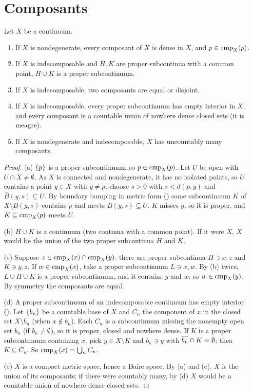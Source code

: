 \section{Composants}

\begin{theorem}\label{thm:composants}
Let $X$ be a continuum.
\begin{enumerate}[label=(\alph*)]
\item If $X$ is nondegenerate, every composant of $X$ is dense in $X$, and $p\in\operatorname{cmp}_{X}(p)$.
\item If $X$ is indecomposable and $H,K$ are proper subcontinua with a common point, $H\cup K$ is a
proper subcontinuum.
\item If $X$ is indecomposable, two composants are equal or disjoint.
\item If $X$ is indecomposable, every proper subcontinuum has empty interior in $X$, and every
composant is a countable union of nowhere dense closed sets (it is meagre).
\item If $X$ is nondegenerate and indecomposable, $X$ has uncountably many composants.
\end{enumerate}
\end{theorem}

\begin{proof}
(a) $\left\{ p \right\}$ is a proper subcontinuum, so $p\in\operatorname{cmp}_{X}(p)$. Let $U$ be open with $U\cap X\neq\emptyset$. As $X$
is connected and nondegenerate, it has no isolated points, so $U$ contains a point $y\in X$ with $y\ne
p$; choose $s>0$ with $s<d(p,y)$ and $\bar B(y,s)\subseteq U$. By boundary bumping in metric form
() some subcontinuum $K$ of $X\setminus B(y,s)$ contains $p$ and meets $\bar
B(y,s)\subseteq U$. $K$ misses $y$, so it is proper, and $K\subseteq\operatorname{cmp}_{X}(p)$ meets $U$.

(b) $H\cup K$ is a continuum (two continua with a common point). If it were $X$, $X$ would be the union of
the two proper subcontinua $H$ and $K$.

(c) Suppose $z\in\operatorname{cmp}_{X}(x)\cap\operatorname{cmp}_{X}(y)$: there are proper subcontinua $H\ni x,z$ and $K\ni y,z$. If $w\in\operatorname{cmp}_{X}(x)$, take a proper subcontinuum $L\ni x,w$. By (b) twice, $L\cup H\cup K$ is a proper subcontinuum, and it
contains $y$ and $w$; so $w\in\operatorname{cmp}_{X}(y)$. By symmetry the composants are equal.

(d) A proper subcontinuum of an indecomposable continuum has empty interior (). Let
$\left\{ b_n \right\}$ be a countable base of $X$ and $C_n$ the component of $x$ in the closed set $X\setminus b_n$
(when $x\notin b_n$). Each $C_n$ is a subcontinuum missing the nonempty open set $b_n$ (if $b_n\neq\emptyset$), so
it is proper, closed and nowhere dense. If $K$ is a proper subcontinuum containing $x$, pick $y\in X\setminus
K$ and $b_n\ni y$ with $\overline{b_n}\cap K=\emptyset$; then $K\subseteq C_n$. So $\operatorname{cmp}_{X}(x)=\bigcup_n C_n$.

(e) $X$ is a compact metric space, hence a Baire space. By (a) and (c), $X$ is the union of its composants;
if there were countably many, by (d) $X$ would be a countable union of nowhere dense closed sets.
\end{proof}

